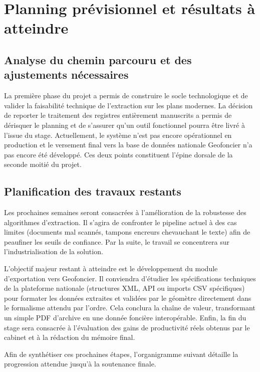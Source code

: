 \documentclass[a4paper,11pt]{article}
\begin{document}
\section{Planning prévisionnel et résultats à atteindre}

\subsection{Analyse du chemin parcouru et des ajustements nécessaires}
La première phase du projet a permis de construire le socle technologique et de valider la faisabilité technique de l'extraction sur les plans modernes. La décision de reporter le traitement des registres entièrement manuscrits a permis de dérisquer le planning et de s'assurer qu'un outil fonctionnel pourra être livré à l'issue du stage. Actuellement, le système n'est pas encore opérationnel en production et le versement final vers la base de données nationale Geofoncier n'a pas encore été développé. Ces deux points constituent l'épine dorsale de la seconde moitié du projet.

\subsection{Planification des travaux restants}
Les prochaines semaines seront consacrées à l'amélioration de la robustesse des algorithmes d'extraction. Il s'agira de confronter le pipeline actuel à des cas limites (documents mal scannés, tampons encreurs chevauchant le texte) afin de peaufiner les seuils de confiance. Par la suite, le travail se concentrera sur l'industrialisation de la solution. 

L'objectif majeur restant à atteindre est le développement du module d'exportation vers Geofoncier. Il conviendra d'étudier les spécifications techniques de la plateforme nationale (structures XML, API ou imports CSV spécifiques) pour formater les données extraites et validées par le géomètre directement dans le formalisme attendu par l'ordre. Cela conclura la chaîne de valeur, transformant un simple PDF d'archive en une donnée foncière interopérable. Enfin, la fin du stage sera consacrée à l'évaluation des gains de productivité réels obtenus par le cabinet et à la rédaction du mémoire final.

\vspace{1.5em}
\noindent Afin de synthétiser ces prochaines étapes, l'organigramme suivant détaille la progression attendue jusqu'à la soutenance finale.
\end{document}
